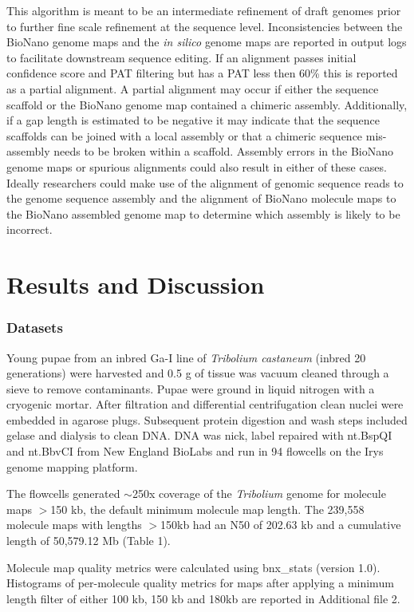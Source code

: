 \documentclass{bmcart}
\begin{document}
This algorithm is meant to be an intermediate refinement of draft genomes prior to further fine scale refinement at the sequence level. Inconsistencies between the BioNano genome maps and the \textit{in silico} genome maps are reported in output logs to facilitate downstream sequence editing. If an alignment passes initial confidence score and PAT filtering but has a PAT less then 60\% this is reported as a partial alignment. A partial alignment may occur if either the sequence scaffold or the BioNano genome map contained a chimeric assembly. Additionally, if a gap length is estimated to be negative it may indicate that the sequence scaffolds can be joined with a local assembly or that a chimeric sequence mis-assembly needs to be broken within a scaffold. Assembly errors in the BioNano genome maps or spurious alignments could also result in either of these cases. Ideally researchers could make use of the alignment of genomic sequence reads to the genome sequence assembly and the alignment of BioNano molecule maps to the BioNano assembled genome map to determine which assembly is likely to be incorrect.
 
\section*{Results and Discussion}

\subsubsection*{Datasets}

Young pupae from an inbred Ga-I line of \textit{Tribolium castaneum} (inbred 20 generations) were harvested and 0.5 g of tissue was vacuum cleaned through a sieve to remove contaminants. Pupae were ground in liquid nitrogen with a cryogenic mortar. After filtration and differential centrifugation clean nuclei were embedded in agarose plugs. Subsequent protein digestion and wash steps included gelase and dialysis to clean DNA. DNA was nick, label repaired with nt.BspQI and nt.BbvCI from New England BioLabs and run in 94 flowcells on the Irys genome mapping platform. 

The flowcells generated $\sim$250x coverage of the \textit{Tribolium} genome for molecule maps $>$150 kb, the default minimum molecule map length. The 239,558 molecule maps with lengths $>$150kb had an N50 of 202.63 kb and a cumulative length of 50,579.12 Mb (Table 1). 

Molecule map quality metrics were calculated using bnx\_stats (version 1.0). Histograms of per-molecule quality metrics for maps after applying a minimum length filter of either 100 kb, 150 kb and 180kb are reported in Additional file 2.
\end{document}
